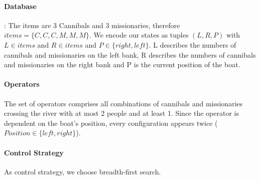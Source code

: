 \documentclass[11pt]{article}
\begin{document}
\paragraph{Database}: The items are 3 Cannibals and 3 missionaries, therefore $items = \{C,C,C,M,M,M\}$. We encode our states as tuples $(L,R,P)$ with $L \in items$ and $R \in items$ and $P \in \{right,left\}$. L describes the numbers of cannibals and missionaries on the left bank, R describes the numbers of cannibals and missionaries on the right bank and P is the current position of the boat.

\paragraph{Operators} The set of operators comprises all combinations of cannibals and missionaries crossing the river with at most 2 people and at least 1. Since the operator is dependent on the boat's position, every configuration appears twice ($Position \in \{left,right\}$). 

\paragraph{Control Strategy}
As control strategy, we choose breadth-first search.
\end{document}
